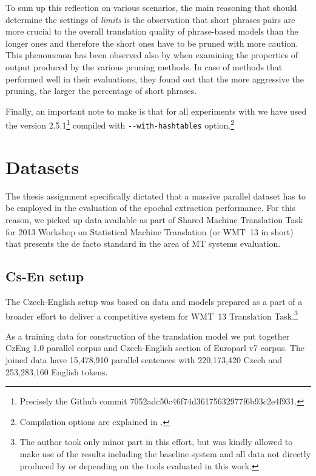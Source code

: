 To sum up this reflection on various \eppex{} scenarios, the main reasoning that should
determine the settings of \emph{limits} is the observation that short phrases pairs are
more crucial to the overall translation quality of phrase-based models than the longer ones
and therefore the short ones have to be pruned with more caution.
This phenomenon has been observed also by \citet[p. 7]{zens:systcomp} when examining the
properties of output produced by the various pruning methods. In case of methods that
performed well in their evaluations, they found out that the more aggressive the pruning,
the larger the percentage of short phrases.

Finally, an important note to make is that for all experiments with \eppex{} we have used
the version 2.5.1\footnote{Precisely the Github commit 7052adc50c46f74d36175632977f6b93c2e4f931.}
compiled with \verb|--with-hashtables| option.\footnote{Compilation options are explained in
.}

\section{Datasets}

The thesis assignment specifically dictated that a massive parallel dataset has to be
employed in the evaluation of the epochal extraction performance.
For this reason, we picked up data available as part of Shared Machine Translation Task
for 2013 Workshop on Statistical Machine Translation (or WMT~13 in short) that presents
the de facto standard in the area of MT systems evaluation.

\subsection{Cs-En setup}

The Czech-English setup was based on data and models prepared as a part of a broader
effort to deliver a competitive system for WMT~13 Translation Task.\footnote{The author
took only minor part in this effort, but was kindly allowed to make use of the results
including the baseline system and all data not directly produced by or depending on
the tools evaluated in this work.}

As a training data for construction of the translation model we put together CzEng 1.0
parallel corpus \citep{czeng10:lrec2012}
and Czech-English section of Europarl v7 corpus.
The joined data have 15,478,910 parallel sentences with 220,173,420 Czech and 253,283,160
English tokens.

